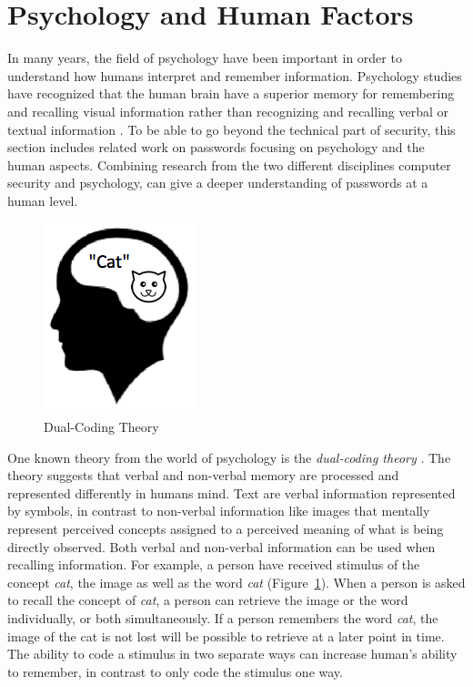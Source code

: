 \section{Psychology and Human Factors}\label{sec:humanfactors}

	In many years, the field of psychology have been important in order to understand how humans interpret and remember information. Psychology studies have recognized that the human brain have a superior memory for remembering and recalling visual information rather than recognizing and recalling verbal or textual information \cite{DeAngeli}. To be able to go beyond the technical part of security, this section includes related work on passwords focusing on psychology and the human aspects. Combining research from the two different disciplines computer security and psychology, can give a deeper understanding of passwords at a human level.

		\begin{figure}
      \vspace{-10pt}
      \begin{center}
        \includegraphics[scale=0.5]{pics/review/dualCoding.png}
      \end{center}
      \vspace{-10pt}
      \caption{Dual-Coding Theory}
      \vspace{-10pt}
      \label{fig:dualcoding}
    \end{figure}

	One known theory from the world of psychology is the {\it dual-coding theory} \cite{Biddle}. The theory suggests that verbal and non-verbal memory are processed and represented differently in humans mind. Text are verbal information represented by symbols, in contrast to non-verbal information like images that mentally represent perceived concepts assigned to a perceived meaning of what is being directly observed. Both verbal and non-verbal information can be used when recalling information. For example, a person have received stimulus of the concept {\it cat}, the image as well as the word {\it cat} (Figure~\ref{fig:dualcoding}). When a person is asked to recall the concept of {\it cat}, a person can retrieve the image or the word individually, or both simultaneously. If a person remembers the word {\it cat}, the image of the cat is not lost will be possible to retrieve at a later point in time. The ability to code a stimulus in two separate ways can increase human's ability to remember, in contrast to only code the stimulus one way.

